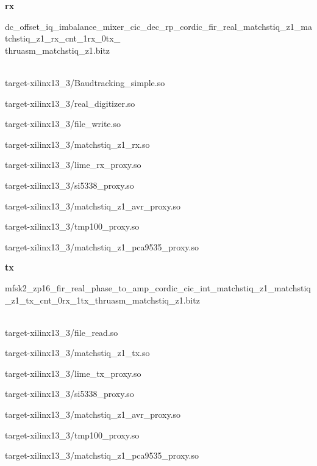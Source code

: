 	\noindent\textbf{rx}
	\begin{itemize}
	\item dc\_offset\_iq\_imbalance\_mixer\_cic\_dec\_rp\_cordic\_fir\_real\_matchstiq\_z1\_matchstiq\_z1\_rx\_cnt\_1rx\_0tx\_ \\ thruasm\_matchstiq\_z1.bitz \\ \\
	\begin{minipage}[t]{.5\textwidth}\item target-xilinx13\_3/Baudtracking\_simple.so
	\item target-xilinx13\_3/real\_digitizer.so
	\item target-xilinx13\_3/file\_write.so
	\item target-xilinx13\_3/matchstiq\_z1\_rx.so
	\item target-xilinx13\_3/lime\_rx\_proxy.so
	\end{minipage}
	\begin{minipage}[t]{.5\textwidth}	\item target-xilinx13\_3/si5338\_proxy.so
	\item target-xilinx13\_3/matchstiq\_z1\_avr\_proxy.so
	\item target-xilinx13\_3/tmp100\_proxy.so
	\item target-xilinx13\_3/matchstiq\_z1\_pca9535\_proxy.so
	\end{minipage}
	\end{itemize}

	\noindent\textbf{tx}
	\begin{itemize}
	\item
mfsk2\_zp16\_fir\_real\_phase\_to\_amp\_cordic\_cic\_int\_matchstiq\_z1\_matchstiq\_z1\_tx\_cnt\_0rx\_1tx\_thruasm\_matchstiq\_z1.bitz	\\ \\
	\begin{minipage}[t]{.5\textwidth}
	\item target-xilinx13\_3/file\_read.so
	\item target-xilinx13\_3/matchstiq\_z1\_tx.so
	\item target-xilinx13\_3/lime\_tx\_proxy.so
	\item target-xilinx13\_3/si5338\_proxy.so
	\end{minipage}
	\begin{minipage}[t]{.5\textwidth}
	\item target-xilinx13\_3/matchstiq\_z1\_avr\_proxy.so
	\item target-xilinx13\_3/tmp100\_proxy.so
	\item target-xilinx13\_3/matchstiq\_z1\_pca9535\_proxy.so
	\end{minipage}
	\end{itemize}

